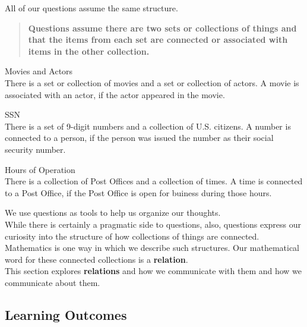 \documentclass{ximera}
\begin{document}
All of our questions assume the same structure.  \\


\begin{quote} 
\textbf{\textcolor{green!50!black}{Questions assume there are two sets or collections of things and that the items from each set are connected or associated with items in the other collection.}} 
\end{quote}


\begin{example} Movies and Actors \\
There is a set or collection of movies and a set or collection of actors.  A movie is associated with an actor, if the actor appeared in the movie.
\end{example}

\begin{example} SSN \\
There is a set of 9-digit numbers and a collection of U.S. citizens.  A number is connected to a person, if the person was issued the number as their social security number.
\end{example}

\begin{example} Hours of Operation \\
There is a collection of Post Offices and a collection of times.  A time is connected to a Post Office, if the Post Office is open for buiness during those hours.
\end{example}

We use questions as tools to help us organize our thoughts. \\


While there is certainly a pragmatic side to questions, also, questions express our curiosity into the structure of how collections of things are connected. Mathematics is one way in which we describe such structures. Our mathematical word for these connected collections is a \textbf{\textcolor{blue!75!black}{relation}}. \\


This section explores \textbf{\textcolor{blue!75!black}{relations}} and how we communicate with them and how we communicate about them. \\










\subsection*{Learning Outcomes}
\end{document}
